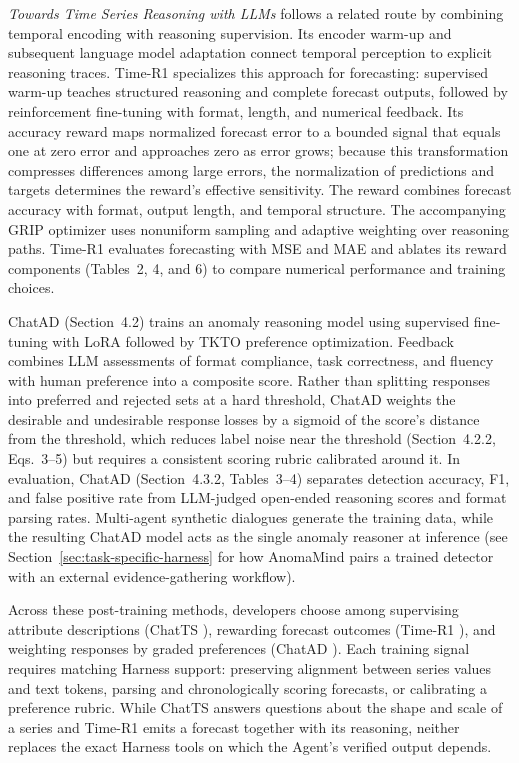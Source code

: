 \documentclass[preprints,article,submit,moreauthors]{Definitions/mdpi}
\begin{document}
\textit{Towards Time Series Reasoning with LLMs} \citep{chow2024tsreasoning} follows a related route by combining temporal encoding with reasoning supervision. Its encoder warm-up and subsequent language model adaptation connect temporal perception to explicit reasoning traces. Time-R1 \citep{timer12025} specializes this approach for forecasting: supervised warm-up teaches structured reasoning and complete forecast outputs, followed by reinforcement fine-tuning with format, length, and numerical feedback. Its accuracy reward maps normalized forecast error to a bounded signal that equals one at zero error and approaches zero as error grows; because this transformation compresses differences among large errors, the normalization of predictions and targets determines the reward's effective sensitivity. The reward combines forecast accuracy with format, output length, and temporal structure. The accompanying GRIP optimizer uses nonuniform sampling and adaptive weighting over reasoning paths. Time-R1 \citep{timer12025} evaluates forecasting with MSE and MAE and ablates its reward components (Tables~2, 4, and 6) to compare numerical performance and training choices.

ChatAD \citep{chatad2026} (Section~4.2) trains an anomaly reasoning model using supervised fine-tuning with LoRA followed by TKTO preference optimization. Feedback combines LLM assessments of format compliance, task correctness, and fluency with human preference into a composite score. Rather than splitting responses into preferred and rejected sets at a hard threshold, ChatAD weights the desirable and undesirable response losses by a sigmoid of the score's distance from the threshold, which reduces label noise near the threshold (Section~4.2.2, Eqs.~3--5) but requires a consistent scoring rubric calibrated around it. In evaluation, ChatAD \citep{chatad2026} (Section~4.3.2, Tables~3--4) separates detection accuracy, F1, and false positive rate from LLM-judged open-ended reasoning scores and format parsing rates. Multi-agent synthetic dialogues generate the training data, while the resulting ChatAD model acts as the single anomaly reasoner at inference (see Section~\ref{sec:task-specific-harness} for how AnomaMind \citep{anomamind2026} pairs a trained detector with an external evidence-gathering workflow).

Across these post-training methods, developers choose among supervising attribute descriptions (ChatTS \citep{chatts2025}), rewarding forecast outcomes (Time-R1 \citep{timer12025}), and weighting responses by graded preferences (ChatAD \citep{chatad2026}). Each training signal requires matching Harness support: preserving alignment between series values and text tokens, parsing and chronologically scoring forecasts, or calibrating a preference rubric. While ChatTS \citep{chatts2025} answers questions about the shape and scale of a series and Time-R1 \citep{timer12025} emits a forecast together with its reasoning, neither replaces the exact Harness tools on which the Agent's verified output depends.
\end{document}
